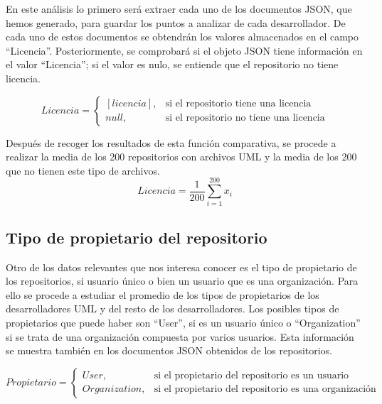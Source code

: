 \documentclass[a4paper, 12pt]{book}
\begin{document}
En este análisis lo primero será extraer cada uno de los documentos JSON, que hemos generado, para guardar los puntos a analizar de cada desarrollador.
De cada uno de estos documentos se obtendrán los valores almacenados en el campo ``Licencia''.
Posteriormente, se comprobará si el objeto JSON tiene información en el valor ``Licencia''; si el valor es nulo, se entiende que el repositorio no tiene licencia.


\begin{equation}
  Licencia =
  \begin{cases}
  [licencia], & \text{si el repositorio tiene una licencia} \\
  null, & \text{si el repositorio no tiene una licencia}
  \end{cases}
\end{equation}

Después de recoger los resultados de esta función comparativa, se procede a realizar la media de los 200 repositorios con archivos UML y la media de los 200 que no tienen este tipo de archivos.
\[{Licencia} = \frac{1}{200} \sum_{i=1}^{200} x_i\]



\subsection{Tipo de propietario del repositorio} %
\label{sec:tipo de propietario del repositorio}

Otro de los datos relevantes que nos interesa conocer es el tipo de propietario de los repositorios, si usuario único o bien un usuario que es una organización. 
Para ello se procede a estudiar el promedio de los tipos de propietarios de los desarrolladores UML y del resto de los desarrolladores.
Los posibles tipos de propietarios que puede haber son ``User'', si es un usuario único o ``Organization'' si se trata de una organización compuesta por varios usuarios.
Esta información se muestra también en los documentos JSON obtenidos de los repositorios.

\begin{equation}
  Propietario =
  \begin{cases}
  User, & \text{si el propietario del repositorio es un usuario} \\
  Organization, & \text{si el propietario del repositorio es una organización}
  \end{cases}
\end{equation}
\end{document}
